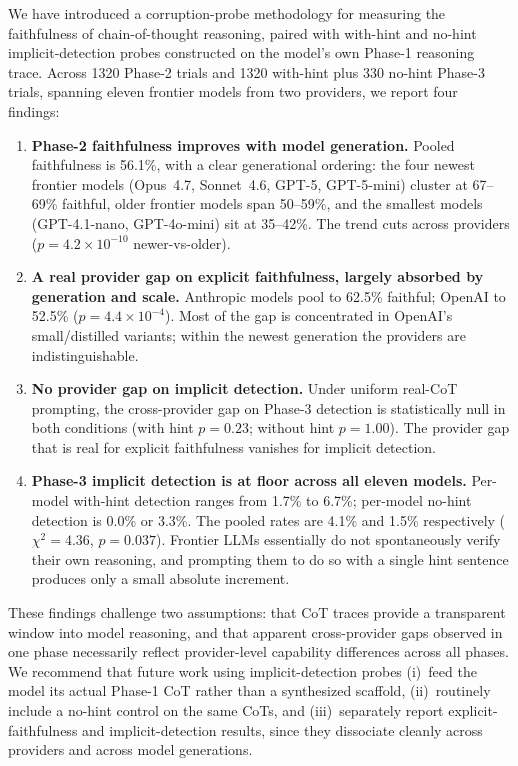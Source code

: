 \documentclass{article}
\begin{document}
We have introduced a corruption-probe methodology for measuring the faithfulness of chain-of-thought reasoning, paired with with-hint and no-hint implicit-detection probes constructed on the model's own Phase-1 reasoning trace. Across 1320 Phase-2 trials and 1320 with-hint plus 330 no-hint Phase-3 trials, spanning eleven frontier models from two providers, we report four findings:

\begin{enumerate}
    \item \textbf{Phase-2 faithfulness improves with model generation.} Pooled faithfulness is 56.1\%, with a clear generational ordering: the four newest frontier models (Opus~4.7, Sonnet~4.6, GPT-5, GPT-5-mini) cluster at 67--69\% faithful, older frontier models span 50--59\%, and the smallest models (GPT-4.1-nano, GPT-4o-mini) sit at 35--42\%. The trend cuts across providers ($p=4.2\!\times\!10^{-10}$ newer-vs-older).
    \item \textbf{A real provider gap on explicit faithfulness, largely absorbed by generation and scale.} Anthropic models pool to 62.5\% faithful; OpenAI to 52.5\% ($p=4.4\!\times\!10^{-4}$). Most of the gap is concentrated in OpenAI's small/distilled variants; within the newest generation the providers are indistinguishable.
    \item \textbf{No provider gap on implicit detection.} Under uniform real-CoT prompting, the cross-provider gap on Phase-3 detection is statistically null in both conditions (with hint $p=0.23$; without hint $p=1.00$). The provider gap that is real for explicit faithfulness vanishes for implicit detection.
    \item \textbf{Phase-3 implicit detection is at floor across all eleven models.} Per-model with-hint detection ranges from 1.7\% to 6.7\%; per-model no-hint detection is 0.0\% or 3.3\%. The pooled rates are 4.1\% and 1.5\% respectively ($\chi^2=4.36$, $p=0.037$). Frontier LLMs essentially do not spontaneously verify their own reasoning, and prompting them to do so with a single hint sentence produces only a small absolute increment.
\end{enumerate}

These findings challenge two assumptions: that CoT traces provide a transparent window into model reasoning, and that apparent cross-provider gaps observed in one phase necessarily reflect provider-level capability differences across all phases. We recommend that future work using implicit-detection probes (i)~feed the model its actual Phase-1 CoT rather than a synthesized scaffold, (ii)~routinely include a no-hint control on the same CoTs, and (iii)~separately report explicit-faithfulness and implicit-detection results, since they dissociate cleanly across providers and across model generations.
\end{document}
